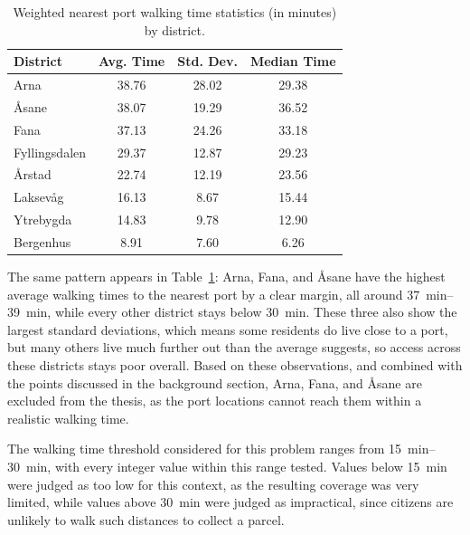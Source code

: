 \documentclass[12pt]{article}
\begin{document}
\begin{table}[htbp]
  \centering
  \caption{Weighted nearest port walking time statistics (in minutes) by district.}
  \label{tab:walking_times}

  \begin{tabular}{l c c c}
    \toprule
    \textbf{District} & \textbf{Avg. Time} & \textbf{Std. Dev.} & \textbf{Median Time} \\
    \midrule
    Arna              & 38.76              & 28.02              & 29.38                \\
    Åsane             & 38.07              & 19.29              & 36.52                \\
    Fana              & 37.13              & 24.26              & 33.18                \\
    Fyllingsdalen     & 29.37              & 12.87              & 29.23                \\
    Årstad            & 22.74              & 12.19              & 23.56                \\
    Laksevåg          & 16.13              & 8.67               & 15.44                \\
    Ytrebygda         & 14.83              & 9.78               & 12.90                \\
    Bergenhus         & 8.91               & 7.60               & 6.26                 \\
    \bottomrule
  \end{tabular}
\end{table}

The same pattern appears in Table~\ref{tab:walking_times}: Arna, Fana, and Åsane have the highest average walking times to the nearest port by a clear margin, all around \qtyrange{37}{39}{\minute}, while every other district stays below \qty{30}{\minute}. These three also show the largest standard deviations, which means some residents do live close to a port, but many others live much further out than the average suggests, so access across these districts stays poor overall. Based on these observations, and combined with the points discussed in the background section, Arna, Fana, and Åsane are excluded from the thesis, as the port locations cannot reach them within a realistic walking time.

The walking time threshold considered for this problem ranges from \qtyrange{15}{30}{\minute}, with every integer value within this range tested. Values below \qty{15}{\minute} were judged as too low for this context, as the resulting coverage was very limited, while values above \qty{30}{\minute} were judged as impractical, since citizens are unlikely to walk such distances to collect a parcel.
\end{document}
